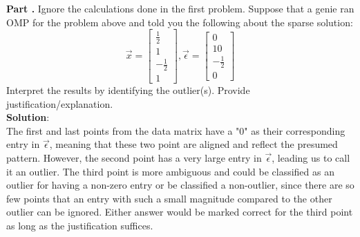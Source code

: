 \documentclass[11pt,letterpaper]{article}
\newcounter{problem}
\newcommand{\problem}{
	\stepcounter{problem}%
	\noindent \textbf{Part \theproblem. }%
}
\begin{document}
\newpage
\problem Ignore the calculations done in the first problem. Suppose that a genie ran OMP for the problem above and told you the following about the sparse solution: %
\begin{equation*}
    \vec{x} = \begin{bmatrix}
        \frac{1}{2} \\ 1 \\ -\frac{1}{2} \\ 1
    \end{bmatrix}, \vec{\epsilon} = \begin{bmatrix}
        0 \\ 10 \\ -\frac{1}{2} \\ 0
    \end{bmatrix}
\end{equation*}
Interpret the results by identifying the outlier(s). Provide justification/explanation. \\

\textbf{Solution}: \\
The first and last points from the data matrix have a "0" as their corresponding entry in $\vec{\epsilon}$, meaning that these two point are aligned and reflect the presumed pattern. However, the second point has a very large entry in $\vec{\epsilon}$, leading us to call it an outlier. The third point is more ambiguous and could be classified as an outlier for having a non-zero entry or be classified a non-outlier, since there are so few points that an entry with such a small magnitude compared to the other outlier can be ignored. Either answer would be marked correct for the third point as long as the justification suffices.

\vspace{1cm}
\end{document}
